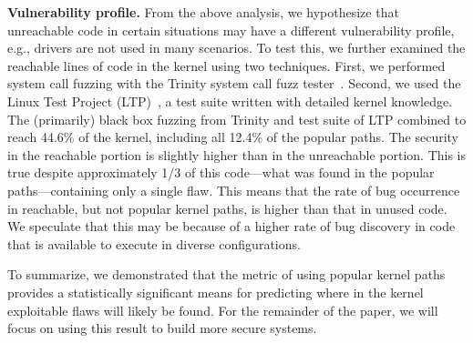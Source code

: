 \textbf{Vulnerability profile.}
From the above analysis, we hypothesize that unreachable code in certain
situations may have a different vulnerability profile, e.g., drivers are not used
in many scenarios.  To test this, we
further examined the reachable lines of
code in the kernel using two techniques. First,
we performed system call fuzzing with the Trinity
system call fuzz tester~\cite{Trinity}.
Second, we used the Linux Test Project (LTP)~\cite{LTP}, a test suite written
with detailed kernel knowledge.
%
The (primarily) black box fuzzing from Trinity and test suite of
LTP combined to reach 44.6\% of the kernel, including all 12.4\% of the popular
paths.  The security in the reachable portion is
slightly higher than in the unreachable portion. This is true despite
approximately 1/3 of this code—what was found in the popular paths—containing
 only a single flaw. This means that the rate of bug occurrence in reachable, but
not popular kernel paths, is higher than that in unused
code. We speculate that this may be because of a higher rate of bug discovery
in code that is available to execute in diverse configurations.

To summarize, we demonstrated that the metric of using popular
kernel paths provides a statistically significant
means for predicting where in the kernel exploitable flaws
will likely be found. For the remainder of the paper, we will
focus on using this result to build more secure systems.
